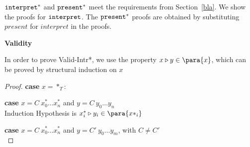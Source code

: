 ${\tt interpret}^*$ and ${\tt present}^*$ meet the requirements from Section~\ref{bla}. We show the proofs for ${\tt interpret}$. The ${\tt present}^*$ proofs are obtained by substituting $present$ for $interpret$ in the proofs.


\bigskip
{\bf Validity}

In order to prove {\sc Valid-Intr*}, we use the property $x \triangleright y \in \para{x}$, which can be proved by structural induction on $x$ 

\begin{proof} 
{\bf case} $x = *_T$:\\

{\bf case} $x = C~x^*_0 \dots x^*_n$ and $y = C~y_0 \dots y_n$\\
Induction Hypothesis is $x^*_i \triangleright y_i \in \para{x*_i}$ \\ 

{\bf case} $x = C~x^*_0 \dots x^*_n$ and $y = C'~y_0 \dots y_m$, with $C \neq C'$\\
\end{proof}

